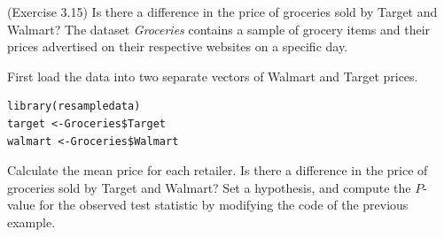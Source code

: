 \clearpage

\bb[resume]
\ii (Exercise 3.15) Is there a difference in the price of groceries sold by Target and Walmart? The dataset \textit{Groceries} contains a sample of grocery items and their prices advertised on their respective websites on a specific day.

\bb
\ii First load the data into two separate vectors of Walmart and Target prices.
\begin{lstlisting}
library(resampledata)
target <-Groceries$Target
walmart <-Groceries$Walmart
\end{lstlisting}

\ii Calculate the mean price for each retailer. \vspace{1in}
\ii Is there a difference in the price of groceries sold by Target and Walmart? Set a hypothesis, and compute the $P$-value for the observed test statistic by modifying the code of the previous example.
\ee
\ee
